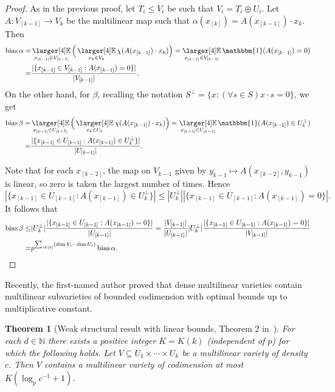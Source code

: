 \documentclass[a4paper,11pt]{article}
\newtheorem{theorem}{Theorem}
\theoremstyle{definition}
\newcommand\id{\mathbbm{1}}
\newcommand{\on}[1]{
	\operatorname{#1}
}
\newcommand{\tdt}{\times\cdots\times}
\newcommand{\exx}{
  \mathop{
    \mathchoice{\vcenter{\hbox{\larger[4]$\mathbb{E}$}}}
               {\kern0pt\mathbb{E}}
               {\kern0pt\mathbb{E}}
               {\kern0pt\mathbb{E}}
  }\displaylimits
}
\begin{document}
\begin{proof}
    As in the previous proof, let $T_i \leq V_i$ be such that $V_i = T_i \oplus U_i$. Let $A : V_{[k-1]} \to V_k$ be the multilinear map such that $\alpha(x_{[k]}) = A(x_{[k-1]}) \cdot x_k$. Then
    \begin{align*}\on{bias} \alpha = &\exx_{x_{[k-1]} \in V_{[k-1]}} \Big(\exx_{x_k \in V_k} \chi(A(x_{[k-1]}) \cdot x_k)\Big) = \exx_{x_{[k-1]} \in V_{[k-1]}} \id(A(x_{[k-1]}) = 0) \\
    = &\frac{|\{x_{[k-1]} \in V_{[k-1]} : A(x_{[k-1]}) = 0\}|}{|V_{[k-1]}|}.\end{align*}
    On the other hand, for $\beta$, recalling the notation $S^\perp = \{x: (\forall s \in S) x \cdot s = 0\}$, we get
    \begin{align*}\on{bias} \beta = &\exx_{x_{[k-1]} \in U_{[k-1]}} \Big(\exx_{x_k \in U_k} \chi(A(x_{[k-1]}) \cdot x_k)\Big) = \exx_{x_{[k-1]} \in U_{[k-1]}} \id(A(x_{[k-1]}) \in U_{k}^\perp) \\
    =& \frac{|\{x_{[k-1]} \in U_{[k-1]} : A(x_{[k-1]}) \in U_k^\perp\}|}{|U_{[k-1]}|}.\end{align*}

    Note that for each $x_{[k-2]}$, the map on $V_{k-1}$ given by $y_{k-1} \mapsto A(x_{[k-2]}, y_{k-1})$ is linear, so zero is taken the largest number of times. Hence 
    \[|\{x_{[k-1]} \in U_{[k-1]} : A(x_{[k-1]}) \in U_k^\perp\}| \leq |U_k^\perp| |\{x_{[k-1]} \in U_{[k-1]} : A(x_{[k-1]}) = 0 \}|.\]
    It follows that 
    \begin{align*}\on{bias} \beta \leq & |U_k^\perp| \frac{|\{x_{[k-1]} \in U_{[k-1]} : A(x_{[k-1]}) = 0 \}|}{|U_{[k-1]}|} = \frac{|V_{[k-1]}|}{|U_{[k-1]}|} |U_k^\perp| \frac{|\{x_{[k-1]} \in U_{[k-1]} : A(x_{[k-1]}) = 0 \}|}{|V_{[k-1]}|}\\
    = & p^{\sum_{i \in [k]} (\dim V_i - \dim U_i)}\on{bias} \alpha.\qedhere\end{align*}
\end{proof}

Recently, the first-named author proved that dense multilinear varieties contain multilinear subvarieties of bounded codimension with optimal bounds up to multiplicative constant. 

\begin{theorem}[Weak structural result with linear bounds, Theorem 2 in~\cite{LukaOptimalWeak}] \label{weakinverse} For each $d \in \mathbb{N}$ there exists a positive integer $K = K(k)$ (independent of $p$) for which the following holds. Let $V \subseteq U_1\tdt U_k$ be a multilinear variety of density $c$. Then $V$ contains a multilinear variety of codimension at most $K (\log_{p} c^{-1} + 1)$. \end{theorem}
\end{document}

